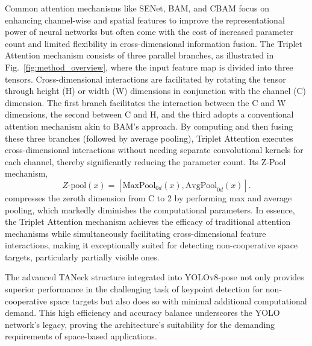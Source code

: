 \documentclass[a4paper,fleqn]{cas-sc}
\begin{document}
Common attention mechanisms like SENet, BAM, and CBAM \citep{senet, cbam, bam} focus on enhancing channel-wise and spatial features to improve the representational power of neural networks but often come with the cost of increased parameter count and limited flexibility in cross-dimensional information fusion. The Triplet Attention mechanism consists of three parallel branches, as illustrated in Fig.~\ref{fig:method_overview}, where the input feature map is divided into three tensors. Cross-dimensional interactions are facilitated by rotating the tensor through height (H) or width (W) dimensions in conjunction with the channel (C) dimension. The first branch facilitates the interaction between the C and W dimensions, the second between C and H, and the third adopts a conventional attention mechanism akin to BAM’s approach. By computing and then fusing these three branches (followed by average pooling), Triplet Attention executes cross-dimensional interactions without needing separate convolutional kernels for each channel, thereby significantly reducing the parameter count. Its Z-Pool mechanism, 
\begin{equation}
Z\text{-pool}(x) = [\text{MaxPool}_{0d}(x), \text{AvgPool}_{0d}(x)].
\end{equation}
compresses the zeroth dimension from C to 2 by performing max and average pooling, which markedly diminishes the computational parameters. In essence, the Triplet Attention mechanism achieves the efficacy of traditional attention mechanisms while simultaneously facilitating cross-dimensional feature interactions, making it exceptionally suited for detecting non-cooperative space targets, particularly partially visible ones.

The advanced TANeck structure integrated into YOLOv8-pose not only provides superior performance in the challenging task of keypoint detection for non-cooperative space targets but also does so with minimal additional computational demand. This high efficiency and accuracy balance underscores the YOLO network's legacy, proving the architecture's suitability for the demanding requirements of space-based applications.
\end{document}
